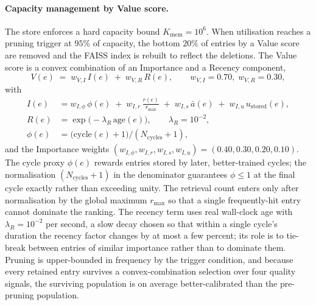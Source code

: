 \paragraph{Capacity management by Value score.}
The store enforces a hard capacity bound $K_{\text{mem}} = 10^{6}$. When utilisation reaches a pruning trigger at $95\%$ of capacity, the bottom $20\%$ of entries by a Value score are removed and the FAISS index is rebuilt to reflect the deletions. The Value score is a convex combination of an Importance and a Recency component,
\begin{equation}
V(e) \;=\; w_{V,I}\,I(e) \;+\; w_{V,R}\,R(e), \qquad w_{V,I} = 0.70,\; w_{V,R} = 0.30,
\label{eq:value}
\end{equation}
with
\begin{align}
I(e) &= w_{I,\phi}\,\phi(e) \;+\; w_{I,r}\,\frac{r(e)}{r_{\max}} \;+\; w_{I,s}\,\bar{a}(e) \;+\; w_{I,u}\,u_{\text{stored}}(e),
\label{eq:importance}\\
R(e) &= \exp\bigl(-\lambda_{R}\,\mathrm{age}(e)\bigr), \qquad \lambda_{R} = 10^{-2},
\label{eq:recency}\\
\phi(e) &= \bigl(\mathrm{cycle}(e) + 1\bigr) / (N_{\text{cycles}} + 1),
\label{eq:phi}
\end{align}
and the Importance weights $(w_{I,\phi}, w_{I,r}, w_{I,s}, w_{I,u}) = (0.40, 0.30, 0.20, 0.10)$. The cycle proxy $\phi(e)$ rewards entries stored by later, better-trained cycles; the normalisation $(N_{\text{cycles}} + 1)$ in the denominator guarantees $\phi \leq 1$ at the final cycle exactly rather than exceeding unity. The retrieval count enters only after normalisation by the global maximum $r_{\max}$ so that a single frequently-hit entry cannot dominate the ranking. The recency term uses real wall-clock age with $\lambda_{R} = 10^{-2}$ per second, a slow decay chosen so that within a single cycle's duration the recency factor changes by at most a few percent; its role is to tie-break between entries of similar importance rather than to dominate them. Pruning is upper-bounded in frequency by the trigger condition, and because every retained entry survives a convex-combination selection over four quality signals, the surviving population is on average better-calibrated than the pre-pruning population.

